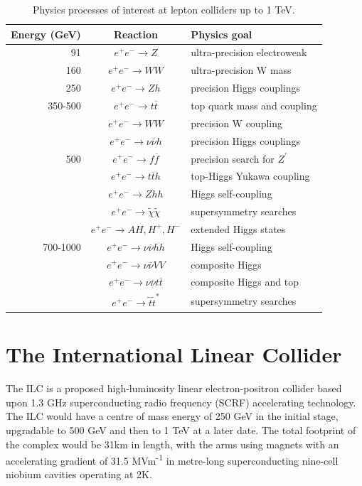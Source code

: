 \begin{table}[b]
\centering
	\begin{tabular}{ r  c  l }
	\hline \hline
	\textbf{Energy (GeV)} & \textbf{Reaction} & \textbf{Physics goal} \\ \hline
	 91 & $e^+ e^- \rightarrow Z$ & ultra-precision electroweak \\ \hline
	 160 & $e^+ e^- \rightarrow WW$ & ultra-precision W mass \\ \hline
	 250 & $e^+ e^- \rightarrow Zh$ & precision Higgs couplings \\ \hline
	 350-500 & $e^+ e^- \rightarrow t\overline{t}$ & top quark mass and coupling \\
	   & $e^+ e^- \rightarrow WW$ & precision W coupling \\
	   & $e^+ e^- \rightarrow \nu \overline{\nu} h$ & precision Higgs couplings \\ \hline
	 500 & $e^+ e^- \rightarrow f \overline{f}$ & precision search for $Z^\prime$ \\
	   & $e^+ e^- \rightarrow t \overline{t}h$ & top-Higgs Yukawa coupling \\
	   & $e^+ e^- \rightarrow Zhh$ & Higgs self-coupling \\
	   & $e^+ e^- \rightarrow \widetilde{\chi} \widetilde{\chi}$ & supersymmetry searches \\
	   & $e^+ e^- \rightarrow AH, H^+, H^-$ & extended Higgs states \\ \hline
	 700-1000 & $e^+ e^- \rightarrow \nu \overline{\nu} hh$ & Higgs self-coupling \\
	   & $e^+ e^- \rightarrow \nu \overline{\nu} VV$ & composite Higgs \\
	   & $e^+ e^- \rightarrow  \nu \overline{\nu} t \overline{t}$ & composite Higgs and top \\
	   & $e^+ e^- \rightarrow \tilde{t} \tilde{t}^*$ & supersymmetry searches \\ \hline \hline
	\end{tabular}
	\caption{Physics processes of interest at lepton colliders up to 1 TeV.}
	\label{table:colliders/physics-goals}
\end{table}


\section{The International Linear Collider}
The \acrfull{ILC} is a proposed high-luminosity linear electron-positron collider based upon 1.3 GHz superconducting radio frequency (\acrshort{SCRF}) accelerating technology. The ILC would have a centre of mass energy of 250 GeV in the initial stage, upgradable to 500 GeV and then to 1 TeV at a later date. The total footprint of the complex would be 31km in length, with the arms using magnets with an accelerating gradient of 31.5 MVm\textsuperscript{-1} in metre-long superconducting nine-cell niobium cavities operating at 2K.

